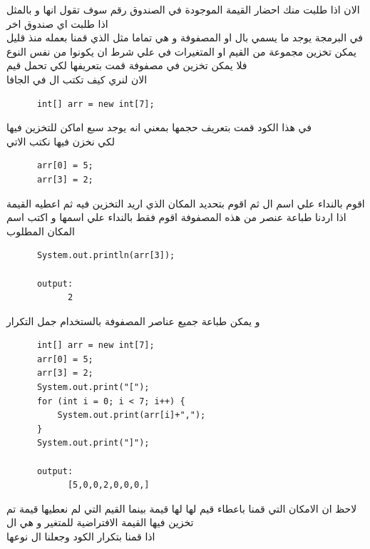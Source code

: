 \begin{AR}
  الان اذا طلبت منك احضار القيمة الموجودة في الصندوق رقم 
  سوف تقول انها  و بالمثل اذا طلبت اي صندوق اخر 
  \\
  في البرمجة يوجد ما يسمي بال او المصفوفة و هي تماما مثل الذي قمنا بعمله منذ قليل 
  يمكن تخزين مجموعة من القيم او المتغيرات في  علي شرط ان يكونوا من نفس النوع فلا يمكن
  تخزين  في مصفوفة قمت بتعريفها لكي تحمل قيم 
  \\
  الان لنري كيف تكتب ال في الجافا 
\end{AR}
\begin{verbatim}
      int[] arr = new int[7];
\end{verbatim}
\begin{AR}
  في هذا الكود قمت بتعريف  حجمها  بمعني انه يوجد سبع اماكن للتخزين فيها
  \\
  لكي نخزن فيها نكتب الاتي 
\end{AR}
\begin{verbatim}
      arr[0] = 5;
      arr[3] = 2;
\end{verbatim}
\begin{AR}
    اقوم بالنداء علي اسم ال ثم اقوم بتحديد المكان الذي اريد التخزين فيه ثم اعطيه القيمة
    \\
    اذا اردنا طباعة عنصر من هذه المصفوفة اقوم فقط بالنداء علي اسمها و اكتب اسم المكان المطلوب 
\end{AR}
\begin{verbatim}
      System.out.println(arr[3]);

      output:
            2
\end{verbatim}
\begin{AR}
  و يمكن طباعة جميع عناصر المصفوفة بالستخدام جمل التكرار 
\end{AR}
\begin{verbatim}
      int[] arr = new int[7];
      arr[0] = 5;
      arr[3] = 2;
      System.out.print("[");
      for (int i = 0; i < 7; i++) {
          System.out.print(arr[i]+",");
      }
      System.out.print("]");

      output:
            [5,0,0,2,0,0,0,]
\end{verbatim}
\begin{AR}
  لاحظ ان الامكان التي قمنا باعطاء قيم لها لها قيمة بينما القيم التي لم 
  نعطيها قيمة تم تخزين فيها القيمة الافتراضية للمتغير  و هي ال 
  \\
  اذا قمنا بتكرار الكود وجعلنا ال نوعها 
\end{AR}

